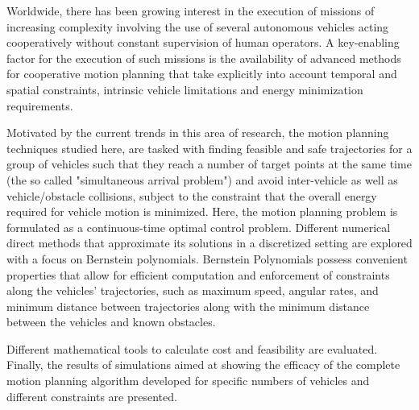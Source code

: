 \noindent

\par Worldwide, there has been growing interest in  the execution of missions of increasing complexity involving the use of several autonomous vehicles acting cooperatively without constant supervision of human operators. A key-enabling factor for the execution of such missions is the availability of advanced methods for cooperative motion planning that take explicitly into account temporal and spatial constraints, intrinsic vehicle limitations and energy minimization requirements.
\par Motivated by the current trends in this area of research, the motion planning techniques studied here, are tasked with finding feasible and safe trajectories for a group of vehicles such that they reach a number of target points at the same time (the so called "simultaneous arrival problem") and avoid inter-vehicle as well as vehicle/obstacle collisions, subject to the constraint that the overall energy required for vehicle motion is minimized.
Here, the motion planning problem is formulated as a continuous-time optimal control problem. Different numerical direct methods that approximate its solutions in a discretized setting are explored with a focus on Bernstein polynomials. Bernstein Polynomials possess convenient properties that allow for efficient computation and enforcement of constraints along the vehicles’ trajectories, such as maximum speed, angular rates, and minimum distance between trajectories along with the minimum distance between the vehicles and known obstacles.
\par Different mathematical tools to calculate cost and feasibility are evaluated. Finally, the results of simulations aimed at showing the efficacy of the complete motion planning algorithm developed for specific numbers of vehicles and different constraints are presented.
